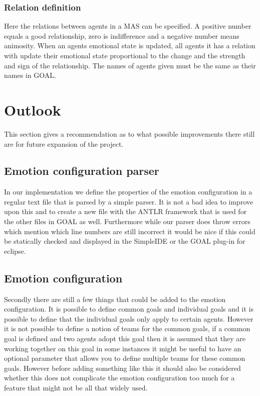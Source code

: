 \documentclass[11pt]{article}
\begin{document}
\subsubsection*{Relation definition}
Here the relations between agents in a MAS can be specified. A positive number equals a good relationship, zero is indifference and a negative number means animosity. When an agents emotional state is updated, all agents it has a relation with update their emotional state proportional to the change and the strength and sign of the relationship. The names of agents given must be the same as their names in GOAL.


\section{Outlook}
This section gives a recommendation as to what possible improvements there still are for future expansion of the project.

\subsection{Emotion configuration parser}
In our implementation we define the properties of the emotion configuration in a regular text file that is parsed by a simple parser. It is not a bad idea to improve upon this and to create a new file with the ANTLR framework that is used for the other files in GOAL as well. Furthermore while our parser does throw errors which mention which line numbers are still incorrect it would be nice if this could be statically checked and displayed in the SimpleIDE or the GOAL plug-in for eclipse.

\subsection{Emotion configuration}
Secondly there are still a few things that could be added to the emotion configuration. It is possible to define common goals and individual goals and it is possible to define that the individual goals only apply to certain agents. However it is not possible to define a notion of teams for the common goals, if a common goal is defined and two agents adopt this goal then it is assumed that they are working together on this goal in some instances it might be useful to have an optional parameter that allows you to define multiple teams for these common goals. However before adding something like this it should also be considered whether this does not complicate the emotion configuration too much for a feature that might not be all that widely used.
\end{document}
